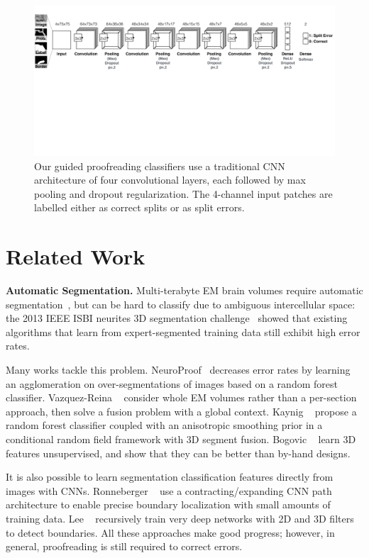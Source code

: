 \begin{figure}[t]
\centering
\includegraphics[width=\linewidth]{architecture.pdf}
\caption{Our guided proofreading classifiers use a traditional CNN architecture of four convolutional layers, each followed by max pooling and dropout regularization. The 4-channel input patches are labelled either as correct splits or as split errors.}
\label{fig:architecture}
\end{figure}

\section{Related Work}

\textbf{Automatic Segmentation.} Multi-terabyte EM brain volumes require automatic segmentation~\cite{jain2010,Liu2014,NunezIglesias2013Machine,GALA2014}, but can be hard to classify due to ambiguous intercellular space: the 2013 IEEE ISBI neurites 3D segmentation challenge~\cite{isbi_challenge} showed that existing algorithms that learn from expert-segmented training data still exhibit high error rates.

Many works tackle this problem. NeuroProof~\cite{neuroproof2013} decreases error rates by learning an agglomeration on over-segmentations of images based on a random forest classifier. Vazquez-Reina \etal~\cite{amelio_segmentation} consider whole EM volumes rather than a per-section approach, then solve a fusion problem with a global context. Kaynig \etal~\cite{kaynig10} propose a random forest classifier coupled with an anisotropic smoothing prior in a conditional random field framework with 3D segment fusion. Bogovic \etal~\cite{BogovicHJ13} learn 3D features unsupervised, and show that they can be better than by-hand designs.

It is also possible to learn segmentation classification features directly from images with CNNs. Ronneberger \etal~\cite{RonnebergerFB15} use a contracting/expanding CNN path architecture to enable precise boundary localization with small amounts of training data. Lee \etal~\cite{lee2015recursive} recursively train very deep networks with 2D and 3D filters to detect boundaries.
%
All these approaches make good progress; however, in general, proofreading is still required to correct errors.

